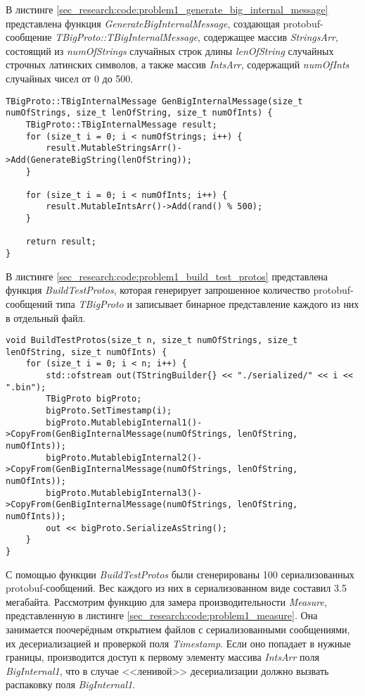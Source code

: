 В листинге \ref{sec_research:code:problem1_generate_big_internal_message} представлена функция \textit{GenerateBigInternalMessage}, создающая protobuf-сообщение \textit{TBigProto::TBigInternalMessage}, содержащее массив \textit{StringsArr}, состоящий из \textit{numOfStrings} случайных строк длины \textit{lenOfString} случайных строчных латинских символов, а также массив \textit{IntsArr}, содержащий \textit{numOfInts} случайных чисел от 0 до 500.

\begin{lstlisting}[style=CodeListing, captionpos=b, caption={Функция GenerateBigInternalMessage}, label=sec_research:code:problem1_generate_big_internal_message]
TBigProto::TBigInternalMessage GenBigInternalMessage(size_t numOfStrings, size_t lenOfString, size_t numOfInts) {
    TBigProto::TBigInternalMessage result;
    for (size_t i = 0; i < numOfStrings; i++) {
        result.MutableStringsArr()->Add(GenerateBigString(lenOfString));
    }

    for (size_t i = 0; i < numOfInts; i++) {
        result.MutableIntsArr()->Add(rand() % 500);
    }

    return result;
}
\end{lstlisting}

В листинге \ref{sec_research:code:problem1_build_test_protos} представлена функция \textit{BuildTestProtos}, которая генерирует запрошенное количество protobuf-сообщений типа \textit{TBigProto} и записывает бинарное представление каждого из них в отдельный файл.

\begin{lstlisting}[style=CodeListing, captionpos=b, caption={Функция BuildTestProtos}, label=sec_research:code:problem1_build_test_protos]
void BuildTestProtos(size_t n, size_t numOfStrings, size_t lenOfString, size_t numOfInts) {
    for (size_t i = 0; i < n; i++) {
        std::ofstream out(TStringBuilder{} << "./serialized/" << i << ".bin");
        TBigProto bigProto;
        bigProto.SetTimestamp(i);
        bigProto.MutablebigInternal1()->CopyFrom(GenBigInternalMessage(numOfStrings, lenOfString, numOfInts));
        bigProto.MutablebigInternal2()->CopyFrom(GenBigInternalMessage(numOfStrings, lenOfString, numOfInts));
        bigProto.MutablebigInternal3()->CopyFrom(GenBigInternalMessage(numOfStrings, lenOfString, numOfInts));
        out << bigProto.SerializeAsString();
    }
}
\end{lstlisting}

С помощью функции \textit{BuildTestProtos} были сгенерированы 100 сериализованных protobuf-сообщений. Вес каждого из них в сериализованном виде составил 3.5 мегабайта.
Рассмотрим функцию для замера производительности \textit{Measure}, представленную в листинге \ref{sec_research:code:problem1_measure}.
Она занимается поочерёдным открытием файлов с сериализованными сообщениями,
их десериализацией и проверкой поля \textit{Timestamp}. Если оно попадает в нужные границы, производится доступ к первому элементу массива \textit{IntsArr} поля \textit{BigInternal1}, что в случае <<ленивой>> десериализации должно вызвать распаковку поля \textit{BigInternal1}.

